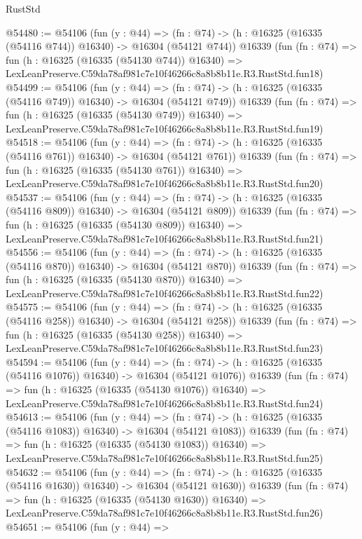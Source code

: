 \begin{lexlean}{RustStd}
\begin{coremodule}
@54480 := @54106
    (fun (y : @44) =>
    (fn : @74) -> (h : @16325 (@16335 (@54116 @744)) @16340) -> @16304 (@54121 @744))
    @16339
    (fun (fn : @74) =>
    fun (h : @16325 (@16335 (@54130 @744)) @16340) =>
    LexLeanPreserve.C59da78af981c7e10f46266c8a8b8b11e.R3.RustStd.fun18)
@54499 := @54106
    (fun (y : @44) =>
    (fn : @74) -> (h : @16325 (@16335 (@54116 @749)) @16340) -> @16304 (@54121 @749))
    @16339
    (fun (fn : @74) =>
    fun (h : @16325 (@16335 (@54130 @749)) @16340) =>
    LexLeanPreserve.C59da78af981c7e10f46266c8a8b8b11e.R3.RustStd.fun19)
@54518 := @54106
    (fun (y : @44) =>
    (fn : @74) -> (h : @16325 (@16335 (@54116 @761)) @16340) -> @16304 (@54121 @761))
    @16339
    (fun (fn : @74) =>
    fun (h : @16325 (@16335 (@54130 @761)) @16340) =>
    LexLeanPreserve.C59da78af981c7e10f46266c8a8b8b11e.R3.RustStd.fun20)
@54537 := @54106
    (fun (y : @44) =>
    (fn : @74) -> (h : @16325 (@16335 (@54116 @809)) @16340) -> @16304 (@54121 @809))
    @16339
    (fun (fn : @74) =>
    fun (h : @16325 (@16335 (@54130 @809)) @16340) =>
    LexLeanPreserve.C59da78af981c7e10f46266c8a8b8b11e.R3.RustStd.fun21)
@54556 := @54106
    (fun (y : @44) =>
    (fn : @74) -> (h : @16325 (@16335 (@54116 @870)) @16340) -> @16304 (@54121 @870))
    @16339
    (fun (fn : @74) =>
    fun (h : @16325 (@16335 (@54130 @870)) @16340) =>
    LexLeanPreserve.C59da78af981c7e10f46266c8a8b8b11e.R3.RustStd.fun22)
@54575 := @54106
    (fun (y : @44) =>
    (fn : @74) -> (h : @16325 (@16335 (@54116 @258)) @16340) -> @16304 (@54121 @258))
    @16339
    (fun (fn : @74) =>
    fun (h : @16325 (@16335 (@54130 @258)) @16340) =>
    LexLeanPreserve.C59da78af981c7e10f46266c8a8b8b11e.R3.RustStd.fun23)
@54594 := @54106
    (fun (y : @44) =>
    (fn : @74) -> (h : @16325 (@16335 (@54116 @1076)) @16340) -> @16304 (@54121 @1076))
    @16339
    (fun (fn : @74) =>
    fun (h : @16325 (@16335 (@54130 @1076)) @16340) =>
    LexLeanPreserve.C59da78af981c7e10f46266c8a8b8b11e.R3.RustStd.fun24)
@54613 := @54106
    (fun (y : @44) =>
    (fn : @74) -> (h : @16325 (@16335 (@54116 @1083)) @16340) -> @16304 (@54121 @1083))
    @16339
    (fun (fn : @74) =>
    fun (h : @16325 (@16335 (@54130 @1083)) @16340) =>
    LexLeanPreserve.C59da78af981c7e10f46266c8a8b8b11e.R3.RustStd.fun25)
@54632 := @54106
    (fun (y : @44) =>
    (fn : @74) -> (h : @16325 (@16335 (@54116 @1630)) @16340) -> @16304 (@54121 @1630))
    @16339
    (fun (fn : @74) =>
    fun (h : @16325 (@16335 (@54130 @1630)) @16340) =>
    LexLeanPreserve.C59da78af981c7e10f46266c8a8b8b11e.R3.RustStd.fun26)
@54651 := @54106
    (fun (y : @44) =>

\end{coremodule}
\end{lexlean}
